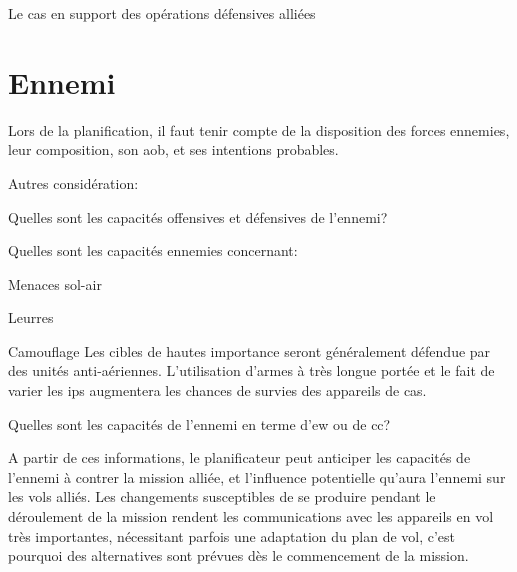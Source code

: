 		\item Le \gls{cas} en support des opérations défensives alliées
		\eee
		\ed
	\ed
\ed

\section{Ennemi}

Lors de la planification, il faut tenir compte de la disposition des forces ennemies, leur composition, son \gls{aob}, et ses intentions probables.

\e
	\item Autres considération:
	\ee
		\item Quelles sont les capacités offensives et défensives de l'ennemi?
		\item Quelles sont les capacités ennemies concernant:
		\eee
			\item Menaces sol-air
			\item Leurres
			\item Camouflage
		\ed
		Les cibles de hautes importance seront généralement défendue par des unités anti-aériennes. L'utilisation d'armes à très longue portée et le fait de varier les \glspl{ip} augmentera les chances de survies des appareils de \gls{cas}.
		\item Quelles sont les capacités de l'ennemi en terme d'\gls{ew} ou de \gls{cc}?
	\ed
	\item A partir de ces informations, le planificateur peut anticiper les capacités de l'ennemi à contrer la mission alliée, et l'influence potentielle qu'aura l'ennemi sur les vols alliés. Les changements susceptibles de se produire pendant le déroulement de la mission rendent les communications avec les appareils en vol très importantes, nécessitant parfois une adaptation du plan de vol, c'est pourquoi des alternatives sont prévues dès le commencement de la mission.
\ed

